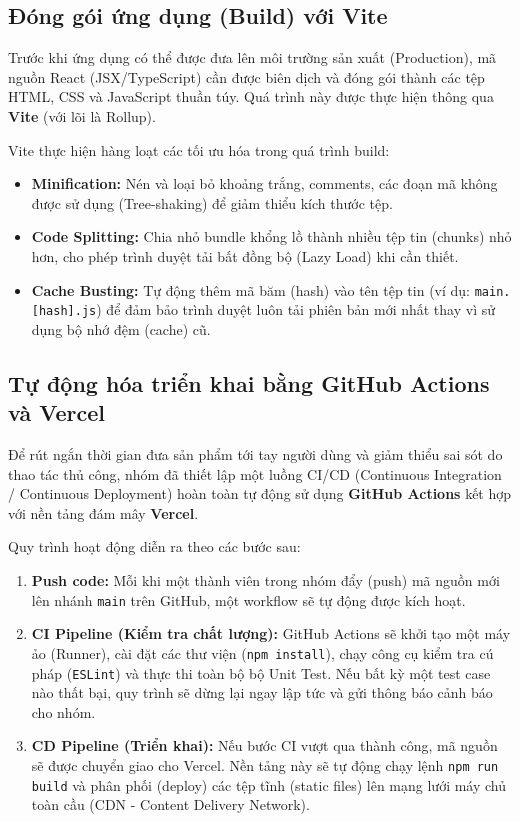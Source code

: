 \subsection{Đóng gói ứng dụng (Build) với Vite}
Trước khi ứng dụng có thể được đưa lên môi trường sản xuất (Production), mã nguồn React (JSX/TypeScript) cần được biên dịch và đóng gói thành các tệp HTML, CSS và JavaScript thuần túy. Quá trình này được thực hiện thông qua \textbf{Vite} (với lõi là Rollup).

Vite thực hiện hàng loạt các tối ưu hóa trong quá trình build:
\begin{itemize}
    \item \textbf{Minification:} Nén và loại bỏ khoảng trắng, comments, các đoạn mã không được sử dụng (Tree-shaking) để giảm thiểu kích thước tệp.
    \item \textbf{Code Splitting:} Chia nhỏ bundle khổng lồ thành nhiều tệp tin (chunks) nhỏ hơn, cho phép trình duyệt tải bất đồng bộ (Lazy Load) khi cần thiết.
    \item \textbf{Cache Busting:} Tự động thêm mã băm (hash) vào tên tệp tin (ví dụ: \texttt{main.[hash].js}) để đảm bảo trình duyệt luôn tải phiên bản mới nhất thay vì sử dụng bộ nhớ đệm (cache) cũ.
\end{itemize}

\subsection{Tự động hóa triển khai bằng GitHub Actions và Vercel}
Để rút ngắn thời gian đưa sản phẩm tới tay người dùng và giảm thiểu sai sót do thao tác thủ công, nhóm đã thiết lập một luồng CI/CD (Continuous Integration / Continuous Deployment) hoàn toàn tự động sử dụng \textbf{GitHub Actions} kết hợp với nền tảng đám mây \textbf{Vercel}.

Quy trình hoạt động diễn ra theo các bước sau:
\begin{enumerate}
    \item \textbf{Push code:} Mỗi khi một thành viên trong nhóm đẩy (push) mã nguồn mới lên nhánh \texttt{main} trên GitHub, một workflow sẽ tự động được kích hoạt.
    \item \textbf{CI Pipeline (Kiểm tra chất lượng):} GitHub Actions sẽ khởi tạo một máy ảo (Runner), cài đặt các thư viện (\texttt{npm install}), chạy công cụ kiểm tra cú pháp (\texttt{ESLint}) và thực thi toàn bộ bộ Unit Test. Nếu bất kỳ một test case nào thất bại, quy trình sẽ dừng lại ngay lập tức và gửi thông báo cảnh báo cho nhóm.
    \item \textbf{CD Pipeline (Triển khai):} Nếu bước CI vượt qua thành công, mã nguồn sẽ được chuyển giao cho Vercel. Nền tảng này sẽ tự động chạy lệnh \texttt{npm run build} và phân phối (deploy) các tệp tĩnh (static files) lên mạng lưới máy chủ toàn cầu (CDN - Content Delivery Network).
\end{enumerate}


